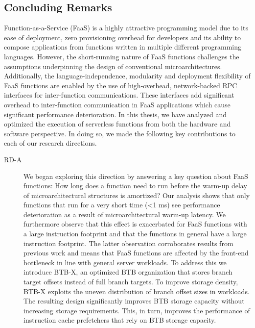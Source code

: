 \documentclass[../main.tex]{subfiles}
\begin{document}
\ifx\chapincluded\undefined
  \begin{refsection}
 \fi

\chapter{Concluding Remarks}
\label{chap:conclusions}
Function-as-a-Service (FaaS) is a highly attractive programming model
due to its ease of deployment, zero provisioning overhead for
developers and its ability to compose applications from functions
written in multiple different programming languages. However, the
short-running nature of FaaS functions challenges the assumptions
underpinning the design of conventional
microarchitectures. Additionally, the language-independence,
modularity and deployment flexibility of FaaS functions are enabled by
the use of high-overhead, network-backed RPC interfaces for
inter-function communications. These interfaces add significant
overhead to inter-function communication in FaaS applications which
cause significant performance deterioration. In this thesis, we have
analyzed and optimized the execution of serverless functions from both
the hardware and software perspective. In doing so, we made the
following key contributions to each of our research directions.

\begin{description}


\item[RD-A] We began exploring this direction by answering a key
  question about FaaS functions: How long does a function need to run
  before the warm-up delay of microarchitectural structures is
  amortized? Our analysis shows that only functions that run for a very
  short time (<1 ms) see performance deterioration as a result of
  microarchitectural warm-up latency. We furthermore observe that this
  effect is exacerbated for FaaS functions with a large instruction
  footprint and that the functions in general have a large instruction
  footprint. The latter observation corroborates results from previous
  work and means that FaaS functions are affected by the front-end
  bottleneck in line with general server workloads. To address this we
  introduce BTB-X, an optimized BTB organization that stores branch
  target offsets instead of full branch targets. To improve storage
  density, BTB-X exploits the uneven distribution of branch offset
  sizes in workloads. The resulting design significantly improves BTB
  storage capacity without increasing storage requirements. This, in
  turn, improves the performance of instruction cache prefetchers that
  rely on BTB storage capacity.


\end{description}
\end{refsection}
\end{document}
